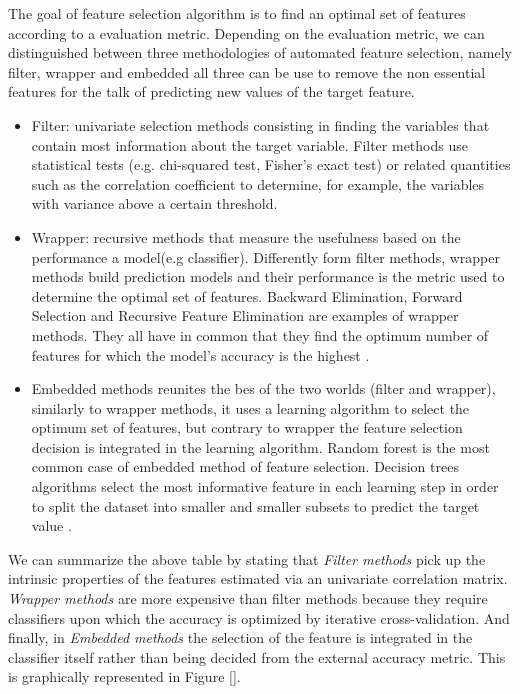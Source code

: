 \documentclass[preprint,12pt]{elsarticle}
\begin{document}
The goal of feature selection algorithm is to find an optimal set of features according to a evaluation metric. Depending on the evaluation metric, we can distinguished between three methodologies of automated feature selection, namely filter, wrapper and embedded all three can be use to remove the non essential features for the talk of predicting new values of the target feature.

\begin{itemize}
	\item Filter: univariate selection methods consisting in finding the variables that contain most information about the target variable. Filter methods use statistical tests (e.g. chi-squared test, Fisher's exact test) or related quantities such as the correlation coefficient to determine, for example, the variables with variance above a certain threshold.
	\item Wrapper: recursive methods that measure the usefulness based on the performance a model(e.g classifier). Differently form filter methods, wrapper methods build prediction models and their performance is the metric used to determine the optimal set of features. Backward Elimination, Forward Selection and Recursive Feature Elimination are examples of wrapper methods. They all have in common that they find the optimum number of features for which the model's accuracy is the highest \cite{Kohavi1997}.
	\item Embedded methods reunites the bes of the two worlds (filter and wrapper), similarly to  wrapper methods, it uses a learning algorithm to select the optimum set of features, but contrary to wrapper the feature selection decision is integrated in the learning algorithm. Random forest is the most common case of embedded method of feature selection. Decision trees algorithms select the most informative feature in each learning step in order to split the dataset into smaller and smaller subsets to predict the target value \cite{breiman2001random}. 
\end{itemize}	
We can summarize the above table by stating that \emph{Filter methods} pick up the intrinsic properties of the features estimated via an univariate correlation matrix. 
\emph{Wrapper methods} are more expensive than filter methods because they require classifiers upon which the accuracy is optimized by iterative cross-validation. And finally, in \emph{Embedded methods} the selection of the feature is integrated in the classifier itself rather than being decided from the external accuracy metric. 
This is graphically represented in Figure \ref{}.
\end{document}
